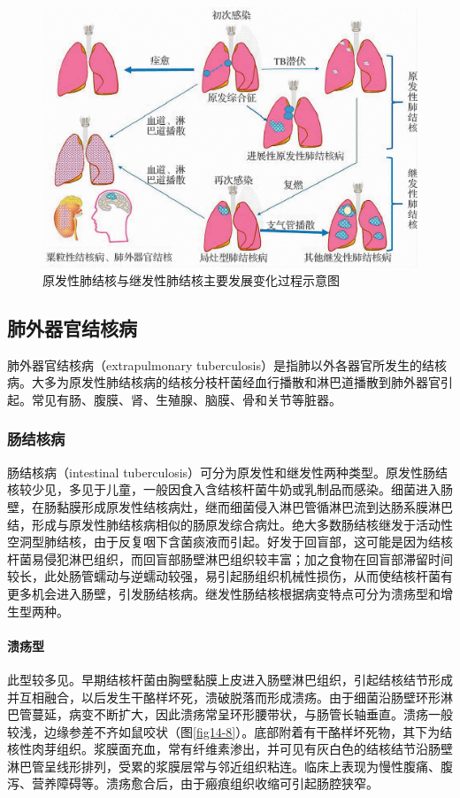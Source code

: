 \begin{figure}[!htbp]
    \centering
    \includegraphics{./images/Image00232.jpg}
    \captionsetup{justification=centering}
    \caption{原发性肺结核与继发性肺结核主要发展变化过程示意图}
    \label{fig14-7}
\end{figure}

\subsection{肺外器官结核病}

肺外器官结核病（extrapulmonary
tuberculosis）是指肺以外各器官所发生的结核病。大多为原发性肺结核病的结核分枝杆菌经血行播散和淋巴道播散到肺外器官引起。常见有肠、腹膜、肾、生殖腺、脑膜、骨和关节等脏器。

\subsubsection{肠结核病}

肠结核病（intestinal
tuberculosis）可分为原发性和继发性两种类型。原发性肠结核较少见，多见于儿童，一般因食入含结核杆菌牛奶或乳制品而感染。细菌进入肠壁，在肠黏膜形成原发性结核病灶，继而细菌侵入淋巴管循淋巴流到达肠系膜淋巴结，形成与原发性肺结核病相似的肠原发综合病灶。绝大多数肠结核继发于活动性空洞型肺结核，由于反复咽下含菌痰液而引起。好发于回盲部，这可能是因为结核杆菌易侵犯淋巴组织，而回盲部肠壁淋巴组织较丰富；加之食物在回盲部滞留时间较长，此处肠管蠕动与逆蠕动较强，易引起肠组织机械性损伤，从而使结核杆菌有更多机会进入肠壁，引发肠结核病。继发性肠结核根据病变特点可分为溃疡型和增生型两种。

\paragraph{溃疡型}
此型较多见。早期结核杆菌由胸壁黏膜上皮进入肠壁淋巴组织，引起结核结节形成并互相融合，以后发生干酪样坏死，溃破脱落而形成溃疡。由于细菌沿肠壁环形淋巴管蔓延，病变不断扩大，因此溃疡常呈环形腰带状，与肠管长轴垂直。溃疡一般较浅，边缘参差不齐如鼠咬状（图\ref{fig14-8}）。底部附着有干酪样坏死物，其下为结核性肉芽组织。浆膜面充血，常有纤维素渗出，并可见有灰白色的结核结节沿肠壁淋巴管呈线形排列，受累的浆膜层常与邻近组织粘连。临床上表现为慢性腹痛、腹泻、营养障碍等。溃疡愈合后，由于瘢痕组织收缩可引起肠腔狭窄。

